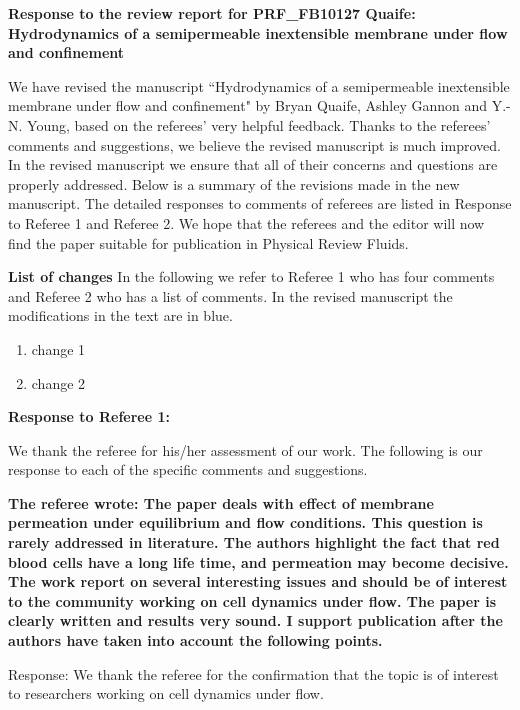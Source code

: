 \documentclass[12pt]{article}
\begin{document}
{\large \bf Response to the review report for PRF\_FB10127 Quaife: Hydrodynamics of a semipermeable inextensible membrane under flow and confinement}
\vspace{0.5cm}

We have revised the manuscript ``Hydrodynamics of a semipermeable inextensible membrane under flow and confinement"  
by Bryan Quaife, Ashley Gannon and Y.-N. Young, 
based on 
the referees' very helpful feedback.  
Thanks to the referees' comments
and suggestions, we believe the revised manuscript is much
improved. 
In the revised manuscript we ensure that
all of their concerns and questions are properly addressed.
Below is a summary of the revisions made in the new manuscript.
The detailed responses to comments of referees are listed in 
Response to Referee 1 and Referee 2.
We hope that the referees and the
editor will now find the paper suitable for publication in 
Physical Review Fluids.

\vspace{0.5cm}
{\large \bf List of changes}
In the following we refer to 
Referee 1 who has four comments and Referee 2 who has a list of comments. In the revised manuscript the modifications in the text are in blue.

\begin{enumerate}
\item{change 1}
\item{change 2}
\end{enumerate}

\newpage
\vspace{0.5cm}
{\large \bf Response to Referee 1:}
\vspace{0.5cm}

We thank the referee for his/her assessment of our work.  The following
is our response to each of the specific comments and suggestions.

{\bf The referee wrote:
The paper deals with effect of membrane permeation under equilibrium and
flow conditions. This question is rarely addressed in literature.  The
authors highlight the fact that red blood cells have a long life time,
and permeation may become decisive. The work report on several
interesting issues and should be of interest to the community working on
cell dynamics under flow. The paper is clearly written and results very
sound. I support publication after the authors have taken into account
the following points.
}

\noindent
Response: We thank the referee for the confirmation that the topic is of interest to researchers working on cell dynamics under flow.
\end{document}
